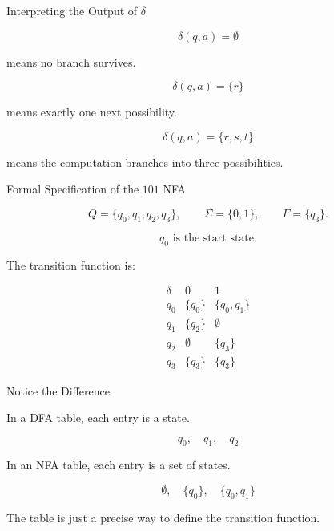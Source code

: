 \documentclass[10pt,aspectratio=169]{beamer}
\begin{document}
\begin{frame}{Interpreting the Output of \(\delta\)}

\[
\delta(q,a)=\emptyset
\]

means no branch survives.

\vspace{1em}

\[
\delta(q,a)=\{r\}
\]

means exactly one next possibility.

\vspace{1em}

\[
\delta(q,a)=\{r,s,t\}
\]

means the computation branches into three possibilities.

\end{frame}

\begin{frame}{Formal Specification of the \(101\) NFA}

\[
Q=\{q_0,q_1,q_2,q_3\},
\qquad
\Sigma=\{0,1\},
\qquad
F=\{q_3\}.
\]

\[
q_0 \text{ is the start state.}
\]

\vspace{1em}

The transition function is:

\[
\begin{array}{c|cc}
\delta & 0 & 1\\
\hline
q_0 & \{q_0\} & \{q_0,q_1\}\\
q_1 & \{q_2\} & \emptyset\\
q_2 & \emptyset & \{q_3\}\\
q_3 & \{q_3\} & \{q_3\}
\end{array}
\]

\end{frame}

\begin{frame}{Notice the Difference}

In a DFA table, each entry is a state.

\[
q_0,\quad q_1,\quad q_2
\]

\vspace{1em}

In an NFA table, each entry is a set of states.

\[
\emptyset,\quad \{q_0\},\quad \{q_0,q_1\}
\]

\vspace{1em}

The table is just a precise way to define the transition function.

\end{frame}
\end{document}
